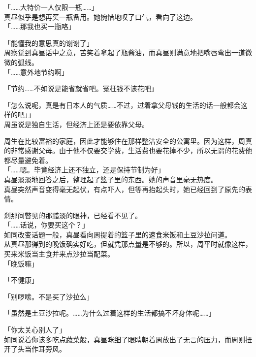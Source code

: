 「……大特价一人仅限一瓶……」\\

真昼似乎是想再买一瓶备用。她惋惜地叹了口气，看向了这边。\\

「……那我也买一瓶咯」

「能懂我的意思真的谢谢了」\\

周察觉到真昼话中之意，苦笑着拿起了瓶酱油，而真昼则满意地把嘴唇弯出一道微微的弧线。\\

「……意外地节约啊」

「节约……不如说是能省就省吧。冤枉钱不该花吧」

「怎么说呢，真是有日本人的气质……不过，过着拿父母钱的生活的话一般都会这样的吧」」\\

周虽说是独自生活，但经济上还是要依靠父母。

周生在比较富裕的家庭，因此才能够住在那样整洁安全的公寓里。因为这样，周真的非常感谢父母。由于他不仅要交学费，生活费也要花掉不少，所以无谓的花费他都尽量避免着。\\

「……嗯。毕竟经济上还不独立，还是保持节制为好」\\

真昼淡淡地回答之后，整理起了篮子里的东西。她的声音里毫无热度。\\

真昼突然声音变得毫无起伏，有点吓人，但等再抬起头时，她已经回到了原先的表情。

刹那间瞥见的那黯淡的眼神，已经看不见了。\\

「……话说，你要买这个？」\\

如同改变话题一般，真昼看向周提着的篮子里的速食米饭和土豆沙拉问道。\\

从真昼那得到的晚饭确实好吃，但就凭那点量是不够的。所以，周平时就像这样，买来米饭当主食并来点沙拉当配菜。\\

「晚饭嘛」

「不健康」

「别啰嗦。不是买了沙拉么」

「虽然是土豆沙拉呢。……为什么过着这样的生活都搞不坏身体呢……」

「你太关心别人了」\\

如同说着你该多吃点蔬菜般，真昼眯细了眼睛朝着周放出了无言的压力，而周则扭开了头当作耳旁风。\\

